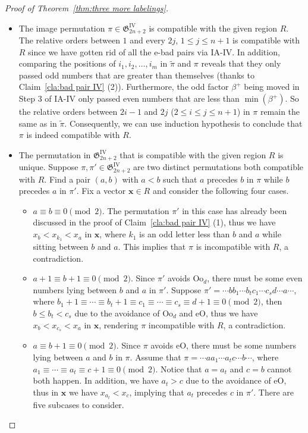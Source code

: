 \documentclass[11pt,reqno]{amsart}
\numberwithin{equation}{section}
\theoremstyle{plain}
\theoremstyle{definition}
\newcommand{\bx}{\mathbf{x}}
\newcommand{\fG}{\mathfrak{G}}
\newcommand{\GIV}{\fG^{\mathrm{IV}}}
\def\eO{\mathrm{eO}}
\def\Oo{\mathrm{Oo}}
\begin{document}
\begin{proof}[Proof of Theorem~\ref{thm:three more labelings}]
\begin{itemize}
\begin{enumerate}
    		
    	\end{enumerate}

    	\item The image permutation $\pi\in\GIV_{2n+2}$ is compatible with the given region $R$. The relative orders between $1$ and every $2j$, $1\le j\le n+1$ is compatible with $R$ since we have gotten rid of all the e-bad pairs via IA-IV. In addition, comparing the positions of $i_1,i_2,\ldots,i_m$ in $\tilde{\pi}$ and $\pi$ reveals that they only passed odd numbers that are greater than themselves (thanks to Claim~\ref{cla:bad pair IV} (2)). Furthermore, the odd factor $\beta^{+}$ being moved in Step 3 of IA-IV only passed even numbers that are less than $\min(\beta^{+})$. So the relative orders between $2i-1$ and $2j$ ($2\le i\le j\le n+1$) in $\pi$ remain the same as in $\tilde{\pi}$. Consequently, we can use induction hypothesis to conclude that $\pi$ is indeed compatible with $R$.
    	
    	\item The permutation in $\GIV_{2n+2}$ that is compatible with the given region $R$ is unique. Suppose $\pi,\pi'\in\GIV_{2n+2}$ are two distinct permutations both compatible with $R$. Find a pair $(a,b)$ with $a<b$ such that $a$ precedes $b$ in $\pi$ while $b$ precedes $a$ in $\pi'$. Fix a vector $\bx\in R$ and consider the following four cases. 
    	\begin{itemize}
    		\item[(i)] $a\equiv b\equiv 0\pmod 2$. The permutation $\pi'$ in this case has already been discussed in the proof of Claim~\ref{cla:bad pair IV} (1), thus we have $x_b<x_{k_1}<x_a$ in $\bx$, where $k_1$ is an odd letter less than $b$ and $a$ while sitting between $b$ and $a$. This implies that $\pi$ is incompatible with $R$, a contradiction. 
    		
    		\item[(ii)] $a+1\equiv b+1\equiv 0\pmod 2$. Since $\pi'$ avoids $\Oo_d$, there must be some even numbers lying between $b$ and $a$ in $\pi'$. Suppose $\pi'=\cdots bb_1\cdots b_tc_1\cdots c_s d\cdots a\cdots$, where $b_1+1\equiv\cdots\equiv b_t+1\equiv c_1\equiv\cdots\equiv c_s \equiv d+1\equiv0\pmod 2$, then $b\le b_t<c_s$ due to the avoidance of $\Oo_d$ and $\eO$, thus we have $x_b<x_{c_s}<x_a$ in $\bx$, rendering $\pi$ incompatible with $R$, a contradiction. 
    		
    		\item[(iii)] $a\equiv b+1\equiv 0\pmod 2$. Since $\pi$ avoids $\eO$, there must be some numbers lying between $a$ and $b$ in $\pi$. Assume that $\pi=\cdots aa_1\cdots a_tc\cdots b\cdots$, where $a_1\equiv\cdots\equiv a_t\equiv c+1\equiv0\pmod 2$. Notice that $a=a_t$ and $c=b$ cannot both happen. In addition, we have $a_t>c$ due to the avoidance of $\eO$, thus in $\bx$ we have $x_{a_t}<x_c$, implying that $a_t$ precedes $c$ in $\pi'$. There are five subcases to consider. 
    		\begin{enumerate}[label=(\alph*)]
    			

\end{enumerate}
\end{itemize}
\end{itemize}
\end{proof}
\end{document}
